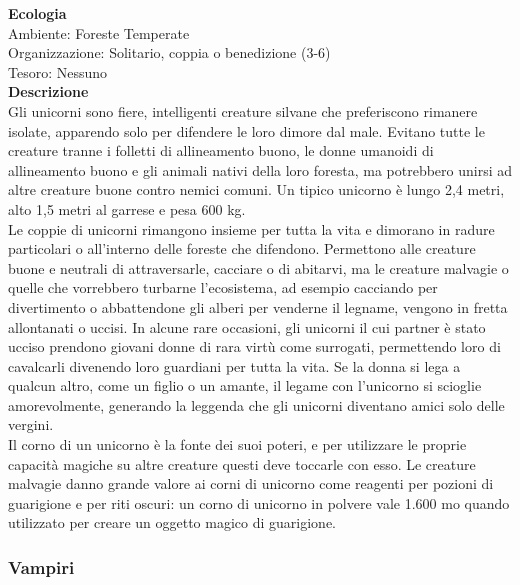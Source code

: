 \begin{multicols}{2}
\textbf{Ecologia}\\
Ambiente: Foreste Temperate\\
Organizzazione: Solitario, coppia o benedizione (3-6)\\
Tesoro: Nessuno\\
\textbf{Descrizione}\\
Gli unicorni sono fiere, intelligenti creature silvane che preferiscono rimanere isolate, apparendo solo per difendere le loro dimore dal male. Evitano tutte le creature tranne i folletti di allineamento buono, le donne umanoidi di allineamento buono e gli animali nativi della loro foresta, ma potrebbero unirsi ad altre creature buone contro nemici comuni. Un tipico unicorno è lungo 2,4 metri, alto 1,5 metri al garrese e pesa 600 kg.\\

Le coppie di unicorni rimangono insieme per tutta la vita e dimorano in radure particolari o all’interno delle foreste che difendono. Permettono alle creature buone e neutrali di attraversarle, cacciare o di abitarvi, ma le creature malvagie o quelle che vorrebbero turbarne l’ecosistema, ad esempio cacciando per divertimento o abbattendone gli alberi per venderne il legname, vengono in fretta allontanati o uccisi. In alcune rare occasioni, gli unicorni il cui partner è stato ucciso prendono giovani donne di rara virtù come surrogati, permettendo loro di cavalcarli divenendo loro guardiani per tutta la vita. Se la donna si lega a qualcun altro, come un figlio o un amante, il legame con l’unicorno si scioglie amorevolmente, generando la leggenda che gli unicorni diventano amici solo delle vergini.\\

Il corno di un unicorno è la fonte dei suoi poteri, e per utilizzare le proprie capacità magiche su altre creature questi deve toccarle con esso. Le creature malvagie danno grande valore ai corni di unicorno come reagenti per pozioni di guarigione e per riti oscuri: un corno di unicorno in polvere vale 1.600 mo quando utilizzato per creare un oggetto magico di guarigione.\\

\subsubsection{Vampiri}


\end{multicols}

